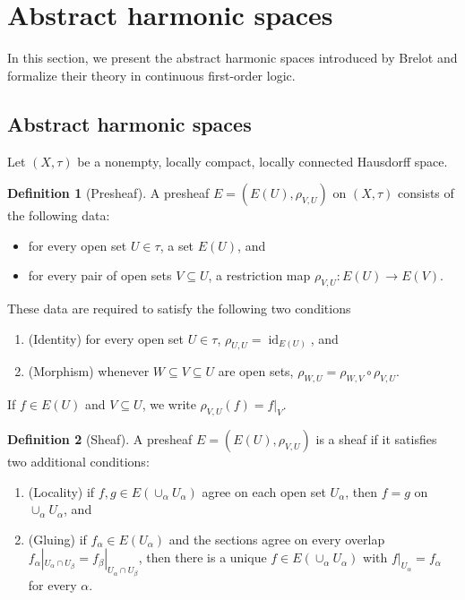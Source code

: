 \documentclass{amsart}
\theoremstyle{definition}
\newtheorem{definition}{Definition}[section]
\theoremstyle{remark}
\numberwithin{equation}{section}
\begin{document}
	
	
	
	
	
	\section{Abstract harmonic spaces}
	In this section, we present the abstract harmonic spaces introduced by Brelot and formalize their theory in continuous first-order logic.
	
	\subsection{Abstract harmonic spaces}
	Let $(X,\tau)$ be a nonempty, locally compact, locally connected Hausdorff space.
	\begin{definition}[Presheaf]
		A presheaf $E=(E(U),\rho_{V,U})$ on $(X,\tau)$
		consists of the following data:
		\begin{itemize}
			\item for every open set $U\in\tau$, a set $E(U)$, and
			\item for every pair of open sets $V\subseteq U$, a restriction map
			$\rho_{V,U}:E(U)\to E(V)$.
		\end{itemize}
		These data are required to satisfy the following two conditions
		\begin{enumerate}
			\item (Identity) for every open set $U\in\tau$,
			$\rho_{U,U}=\operatorname{id}_{E(U)}$, and
			\item (Morphism) whenever $W\subseteq V\subseteq U$ are open sets,
			$\rho_{W,U}=\rho_{W,V}\circ\rho_{V,U}$.
		\end{enumerate}
		If $f\in E(U)$ and $V\subseteq U$, we write $\rho_{V,U}(f)=f|_V$.
	\end{definition}
	
	\begin{definition}[Sheaf]
		A presheaf $E=(E(U),\rho_{V,U})$ is a sheaf if it satisfies two additional
		conditions:
		\begin{enumerate}
			\item[(3)] (Locality) if $f,g\in E(\cup_{\alpha} U_{\alpha})$ agree on each open set $U_\alpha$, then $f=g$ on $\cup_{\alpha} U_{\alpha}$, and
			
			\item[(4)] (Gluing) if $f_\alpha\in E(U_\alpha)$ and the sections agree on every overlap $f_\alpha|_{U_\alpha\cap U_\beta}=f_\beta|_{U_\alpha\cap U_\beta}$, then there is a unique $f\in E(\cup_{\alpha}U_{\alpha})$ with $f|_{U_\alpha}=f_\alpha$ for every $\alpha$.
		\end{enumerate}
	\end{definition}
	
\end{document}
